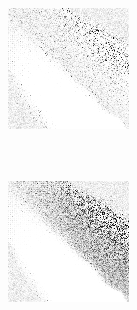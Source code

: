 \begin{figure}
\begin{subfigure}[t]{0.22\textwidth}
		\caption{\handmaxavg}
	\end{subfigure}
~
	\begin{subfigure}[t]{0.22\textwidth}
		\center
		\includegraphics[width=\textwidth]{images/findings/experiments/regularization/strats/0.80/hand_max_med.png}
		\caption{\handmaxmed}
	\end{subfigure}
	~
	\begin{subfigure}[t]{0.22\textwidth}
		\center
		\includegraphics[width=\textwidth]{images/findings/experiments/regularization/strats/0.80/hand_max_poss.png}
		\caption{\handmaxposs}
	\end{subfigure}


\end{figure}
